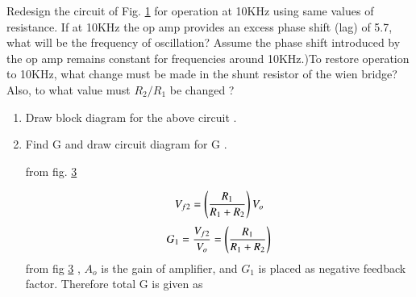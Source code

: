Redesign the circuit of Fig. \ref{fig:ee18btech11049_fig1} for operation at 10KHz using same values of resistance. If at 10KHz the op amp provides an excess phase shift (lag) of 5.7\degree , what will be the frequency of oscillation? Assume the phase shift introduced by the op amp remains constant for frequencies around 10KHz.)To restore operation to 10KHz, what change must be made in the shunt resistor of the wien bridge? Also, to what value must $R_{2}/R_{1}$ be changed ?
\begin{figure}[!ht]
	\begin{center}
		\resizebox{\columnwidth}{!}{}
	\end{center}
\caption{}
\label{fig:ee18btech11049_fig1}
\end{figure}
\begin{enumerate}[label=\arabic*.,ref=\theenumi]

\item Draw block diagram for the above circuit .
\\
\solution  
\begin{figure}[!ht]
	\begin{center}
		\resizebox{\columnwidth}{!}{}
	\end{center}
\caption{}
\label{fig:ee18btech11049_block}
\end{figure}

\item Find G and draw circuit diagram for G .  
\\
\solution  
\begin{figure}[!ht]
	\begin{center}
		\resizebox{\columnwidth}{!}{}
	\end{center}
\caption{}
\label{fig:ee18btech11049_g_block}
\end{figure}

from fig. \ref{fig:ee18btech11049_g_block} 

\begin{align}
    V_{f2} = \left(\frac{R_1}{R_1 + R_2}\right)V_o
\end{align}
\begin{align}
    G_1 = \frac{V_{f2}}{V_o} = \left(\frac{R_1}{R_1 + R_2}\right)
\end{align}
from fig \ref{fig:ee18btech11049_g_block} , $A_o$ is the gain of amplifier, and $G_1$ is placed as negative feedback factor. Therefore total G is given as


\end{enumerate}
